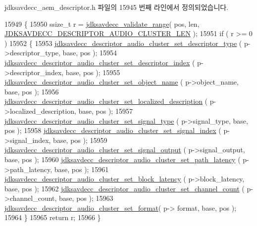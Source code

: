 jdksavdecc\+\_\+aem\+\_\+descriptor.\+h 파일의 15945 번째 라인에서 정의되었습니다.


\begin{DoxyCode}
15949 \{
15950     ssize\_t r = \hyperlink{group__util_ga9c02bdfe76c69163647c3196db7a73a1}{jdksavdecc\_validate\_range}( pos, len, 
      \hyperlink{group__descriptor__audio__cluster_ga1773710c3cbdaea84a913083b3be2fbb}{JDKSAVDECC\_DESCRIPTOR\_AUDIO\_CLUSTER\_LEN} );
15951     \textcolor{keywordflow}{if} ( r >= 0 )
15952     \{
15953         \hyperlink{group__descriptor__audio__cluster_ga7440503255105151f25aaa46ad30ca37}{jdksavdecc\_descriptor\_audio\_cluster\_set\_descriptor\_type}
      ( p->descriptor\_type, base, pos );
15954         \hyperlink{group__descriptor__audio__cluster_ga938162e692528b6c567f975cf98b7642}{jdksavdecc\_descriptor\_audio\_cluster\_set\_descriptor\_index}
      ( p->descriptor\_index, base, pos );
15955         \hyperlink{group__descriptor__audio__cluster_ga9e1502fdbb3064c322bc04f2e76727dd}{jdksavdecc\_descriptor\_audio\_cluster\_set\_object\_name}
      ( p->object\_name, base, pos );
15956         \hyperlink{group__descriptor__audio__cluster_gac680afaa0fe692c74daa944e57c5c53b}{jdksavdecc\_descriptor\_audio\_cluster\_set\_localized\_description}
      ( p->localized\_description, base, pos );
15957         \hyperlink{group__descriptor__audio__cluster_gada4d72079ba2c862cc4f5be6634dfa09}{jdksavdecc\_descriptor\_audio\_cluster\_set\_signal\_type}
      ( p->signal\_type, base, pos );
15958         \hyperlink{group__descriptor__audio__cluster_ga77b3b8c01903f9e71743a1daa1645363}{jdksavdecc\_descriptor\_audio\_cluster\_set\_signal\_index}
      ( p->signal\_index, base, pos );
15959         \hyperlink{group__descriptor__audio__cluster_gaa4565dffa3e72ebd16d16b544c1ecaf1}{jdksavdecc\_descriptor\_audio\_cluster\_set\_signal\_output}
      ( p->signal\_output, base, pos );
15960         \hyperlink{group__descriptor__audio__cluster_ga7c382943e8a3c0f03bc31750f884bd88}{jdksavdecc\_descriptor\_audio\_cluster\_set\_path\_latency}
      ( p->path\_latency, base, pos );
15961         \hyperlink{group__descriptor__audio__cluster_gaaf74c6f91f3808ce1ee102dd85379817}{jdksavdecc\_descriptor\_audio\_cluster\_set\_block\_latency}
      ( p->block\_latency, base, pos );
15962         \hyperlink{group__descriptor__audio__cluster_ga1a067c8955dab9e6ee5528bc5803a773}{jdksavdecc\_descriptor\_audio\_cluster\_set\_channel\_count}
      ( p->channel\_count, base, pos );
15963         \hyperlink{group__descriptor__audio__cluster_gaefa0fcca47ea30bba3dc0a40561f93fe}{jdksavdecc\_descriptor\_audio\_cluster\_set\_format}( p->
      format, base, pos );
15964     \}
15965     \textcolor{keywordflow}{return} r;
15966 \}
\end{DoxyCode}


